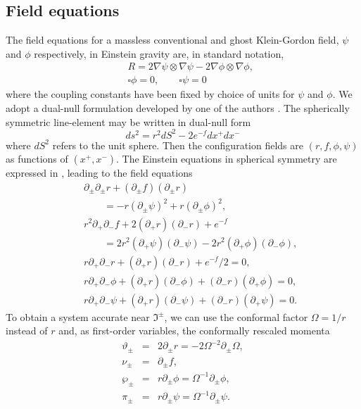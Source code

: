 \documentclass[aps,showpacs,twocolumn,draft,eqsecnum]{revtex4}
\begin{document}
\subsection{Field equations}
The field equations for a massless conventional and ghost Klein-Gordon field,
$\psi$ and $\phi$ respectively, in Einstein gravity are, in standard notation,
\begin{eqnarray}
&&R= 2\nabla\psi\otimes\nabla\psi-2\nabla\phi\otimes\nabla\phi, \\
&&\square \phi=0, \qquad \square \psi=0
\end{eqnarray}
where the coupling constants have been fixed by choice of units for $\psi$ and
$\phi$. We adopt a dual-null formulation developed by one of the authors
\cite{dne}. The spherically symmetric line-element may be written in dual-null
form
\begin{equation}
ds^2=r^2dS^2-2e^{-f}dx^+dx^-
\end{equation}
where $dS^2$ refers to the unit sphere. Then the configuration fields are
$(r,f,\phi,\psi)$ as functions of $(x^+,x^-)$. The Einstein equations in
spherical symmetry are expressed in \cite{sph,1st}, leading to the field
equations
\begin{eqnarray}
&& \partial_\pm\partial_\pm r +(\partial_\pm f)(\partial_\pm r)
  \nonumber \\
&&\qquad= -r(\partial_\pm\psi)^2 +r(\partial_\pm\phi)^2,\\
&&r^2\partial_+\partial_-f +2 (\partial_+r)(\partial_-r) +e^{-f}
\nonumber\\
&&\qquad= 2r^2(\partial_+\psi)(\partial_-\psi)
-2r^2(\partial_+\phi)(\partial_-\phi),
\\
&& r\partial_+\partial_-r+ (\partial_+r)(\partial_-r)+e^{-f}/2
=0,\\
&&r\partial_+\partial_-\phi +(\partial_+r)(\partial_-\phi)
+(\partial_-r)(\partial_+\phi)=0,
\\
&&r\partial_+\partial_-\psi +(\partial_+r)(\partial_-\psi)
+(\partial_-r)(\partial_+\psi)=0.
\end{eqnarray}
To obtain a system accurate near
$\Im^\pm$, we can use the conformal factor $\Omega=1/r$ instead of $r$ and, as
first-order variables, the conformally rescaled momenta
\begin{eqnarray}
\vartheta_\pm&=&2\partial_\pm r=-2\Omega^{-2}\partial_\pm\Omega,
\label{deftheta}\\
\nu_\pm&=&\partial_\pm f, \label{defnu} \\
\wp_\pm&=&r\partial_\pm\phi=\Omega^{-1}\partial_\pm\phi, \label{defwp}\\
\pi_\pm&=&r\partial_\pm\psi=\Omega^{-1}\partial_\pm\psi. \label{defpi}
\end{eqnarray}
\end{document}
